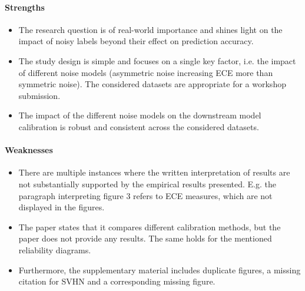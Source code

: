 \documentclass[11pt, a4paper]{include/gdm_format}
\begin{document}
\paragraph{Strengths}

\begin{itemize}
    \item The research question is of real-world importance and shines light on the impact of noisy labels beyond their effect on prediction accuracy.
    \item The study design is simple and focuses on a single key factor, i.e. the impact of different noise models (asymmetric noise increasing ECE more than symmetric noise). The considered datasets are appropriate for a workshop submission.
    \item The impact of the different noise models on the downstream model calibration is robust and consistent across the considered datasets. 
\end{itemize}

\paragraph{Weaknesses}
\begin{itemize}
    \item There are multiple instances where the written interpretation of results are not substantially supported by the empirical results presented. E.g. the paragraph interpreting figure 3 refers to ECE measures, which are not displayed in the figures.
    \item The paper states that it compares different calibration methods, but the paper does not provide any results. The same holds for the mentioned reliability diagrams.
    \item Furthermore, the supplementary material includes duplicate figures, a missing citation for SVHN and a corresponding missing figure.
\end{itemize}
\end{document}
